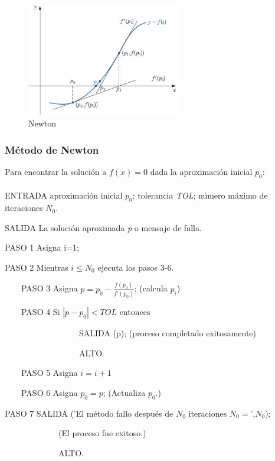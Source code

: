 \begin{figure}[h!]
\centering
  \includegraphics[width=0.6\textwidth]{Newton.JPG}
\caption{Newton}
\label{tab:fig3}
\end{figure} 

\begin{tcolorbox}[colback=blue!15!]
\subsubsection*{Método de Newton}
Para encontrar la solución a $f(x)=0$ dada la aproximación inicial $p_0$:
\\ \\
ENTRADA aproximación inicial $p_0$; tolerancia \textit{TOL}; número máximo de iteraciones $N_0$.

SALIDA La solución aproximada \textit{p} o mensaje de falla.

PASO 1 Asigna i=1;

PASO 2 Mientras $i\leq N_0$ ejecuta los pasos 3-6.

\ \ \ \  PASO 3 Asigna $p=p_0 -\frac{f(p_0)}{f'(p_0)} $; (calcula $p_i$)

\ \ \ \  PASO 4 Si $|p-p_0|<TOL$ entonces

\ \ \ \ \ \ \ \ \ \ \ \ \ \ \ \ \ \ SALIDA (p); (proceso completado exitosamente)

\ \ \ \ \ \ \ \ \ \ \ \ \ \ \ \ \ \ ALTO.

\ \ \ \   PASO 5 Asigna $i=i+1$
    
\ \ \ \   PASO 6 Asigna $p_0=p$; (Actualiza $p_0$.)

PASO 7 SALIDA ('El método fallo después de $N_0$ iteraciones $N_0=$',$N_0$);

\ \ \ \ \ \ \ \ \ \ \ \ \ (El proceso fue exitoso.)

\ \ \ \ \ \ \ \ \ \ \ \ \ ALTO.


\end{tcolorbox}

